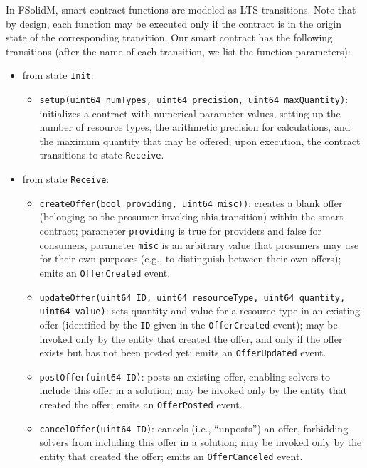 In FSolidM, smart-contract functions are modeled as LTS transitions. Note that by design, each function may be executed only if the contract is in the origin state of the corresponding transition.
Our smart contract  has the following transitions (after the name of each transition, we list the function parameters):
\begin{itemize}[leftmargin=1em, noitemsep]
    \item from state \texttt{Init}:
    \begin{itemize}[noitemsep, leftmargin=0.5em]
        \item \texttt{setup(uint64 numTypes, uint64 precision, uint64 maxQuantity)}: initializes a contract with numerical parameter values, setting up the number of resource types, the arithmetic precision for calculations, and the maximum quantity that may be offered; upon execution, the contract transitions to state \texttt{Receive}.
    \end{itemize}
    \item from state \texttt{Receive}:
    \begin{itemize}[noitemsep, leftmargin=0.5em]
        \item \texttt{createOffer(bool providing, uint64 misc))}: creates a blank offer (belonging to the prosumer invoking this transition) within the smart contract; parameter \texttt{providing} is true for providers and false for consumers, parameter \texttt{misc} is an arbitrary value that prosumers may use for their own purposes (e.g., to distinguish between their own offers); emits an \texttt{OfferCreated} event.
        \item \texttt{updateOffer(uint64 ID, uint64 resourceType, uint64 quantity, uint64 value)}: sets quantity and value for a resource type in an existing  offer (identified by the \texttt{ID} given in the \texttt{OfferCreated} event); may be invoked only by the entity that created the offer, and only if the offer exists but has not been posted yet; emits an \texttt{OfferUpdated} event.
        \item \texttt{postOffer(uint64 ID)}: posts an existing offer, enabling solvers to include this offer in a solution; may be invoked only by the entity that created the offer; emits an \texttt{OfferPosted} event.
        \item \texttt{cancelOffer(uint64 ID)}: cancels (i.e., ``unposts'') an offer, forbidding solvers from including this offer in a solution; may be invoked only by the entity that created the offer; emits an \texttt{OfferCanceled} event.

\end{itemize}
\end{itemize}
